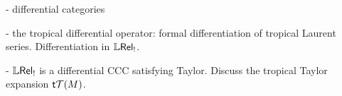 - differential categories

- the tropical differential operator: formal differentiation of tropical Laurent series. Differentiation in $\mathbb{L}\mathsf{Rel}_{!}$.

- $\mathbb{L}\mathsf{Rel}_{!}$ is a differential CCC satisfying Taylor. 
Discuss the tropical Taylor expansion $\mathsf{t} \mathcal{T}(M)$. 
